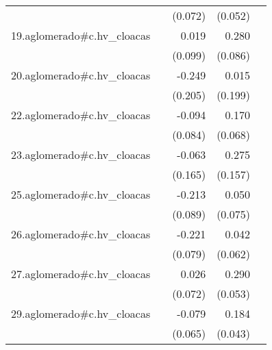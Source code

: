{\begin{longtable}{l*{4}{D{.}{.}{-1}}}
            &                     &     (0.072)         &     (0.052)         &                     \\
\addlinespace
19.aglomerado#c.hv\_cloacas&                     &       0.019         &       0.280\sym{**} &                     \\
            &                     &     (0.099)         &     (0.086)         &                     \\
\addlinespace
20.aglomerado#c.hv\_cloacas&                     &      -0.249         &       0.015         &                     \\
            &                     &     (0.205)         &     (0.199)         &                     \\
\addlinespace
22.aglomerado#c.hv\_cloacas&                     &      -0.094         &       0.170\sym{*}  &                     \\
            &                     &     (0.084)         &     (0.068)         &                     \\
\addlinespace
23.aglomerado#c.hv\_cloacas&                     &      -0.063         &       0.275         &                     \\
            &                     &     (0.165)         &     (0.157)         &                     \\
\addlinespace
25.aglomerado#c.hv\_cloacas&                     &      -0.213\sym{*}  &       0.050         &                     \\
            &                     &     (0.089)         &     (0.075)         &                     \\
\addlinespace
26.aglomerado#c.hv\_cloacas&                     &      -0.221\sym{**} &       0.042         &                     \\
            &                     &     (0.079)         &     (0.062)         &                     \\
\addlinespace
27.aglomerado#c.hv\_cloacas&                     &       0.026         &       0.290\sym{***}&                     \\
            &                     &     (0.072)         &     (0.053)         &                     \\
\addlinespace
29.aglomerado#c.hv\_cloacas&                     &      -0.079         &       0.184\sym{***}&                     \\
            &                     &     (0.065)         &     (0.043)         &                     \\

\end{longtable}}
